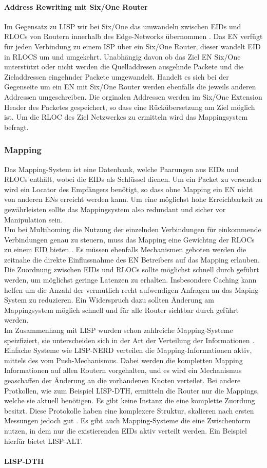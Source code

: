 \paragraph{Address Rewriting mit Six/One Router}
Im Gegensatz zu LISP wir bei Six/One das umwandeln zwischen EIDs und RLOCs von Routern innerhalb des Edge-Networks übernommen \cite{vogt:2008:six}. Das EN verfügt für jeden Verbindung zu einem ISP über ein Six/One Router, dieser wandelt EID in RLOCS um und umgekehrt. Unabhängig davon ob das Ziel EN Six/One unterstützt oder nicht werden die Quelladdresen ausgehnde Packete und die Zieladdressen eingehnder Packete umgewandelt. Handelt es sich bei der Gegenseite um ein EN mit Six/One Router werden ebenfalls die jeweils anderen Addressen umgeschreiben. Die orginalen Addressen werden im Six/One Extension Header des Packetes gespeichert, so dass eine Rückübersetzung am Ziel möglich ist. Um die RLOC des Ziel Netzwerkes zu ermitteln wird das Mappingsystem befragt.

\subsubsection{Mapping}
Das Mapping-System ist eine Datenbank, welche Paarungen aus EIDs und RLOCs enthält, wobei die EIDs als Schlüssel dienen. Um ein Packet zu versenden wird ein Locator des Empfängers benötigt, so dass ohne Mapping ein EN nicht von anderen ENs erreicht werden kann. Um eine möglichst hohe Erreichbarkeit zu gewährleisten sollte das Mappingsystem also redundant und sicher vor Manipulation sein. \\
Um bei Multihoming die Nutzung der einzelnden Verbindungen für einkommende Verbindungen genau zu steuern, muss das Mapping eine Gewichtng der RLOCs zu einem EID bieten \cite{mathy:2008:dht}. Es müssen ebenfalls Mechanismen geboten werden die zeitnahe die direkte Einflussnahme des EN Betreibers auf das Mapping erlauben. \\
Die Zuordnung zwischen EIDs und RLOCs sollte möglichst schnell durch geführt werden, um möglichst geringe Latenzen zu erhalten. Insbesondere Caching kann helfen um die Anzahl der vermutlich recht aufwendigen Anfragen an das Maping-System zu reduzieren. Ein Widerspruch dazu sollten Änderung am Mappingsystem möglich schnell und für alle Router sichtbar durch geführt werden. \\
Im Zusammenhang mit LISP wurden schon zahlreiche Mapping-Systeme speizfiziert, sie unterscheiden sich in der Art der Verteilung der Informationen \cite{mathy:2008:dht}. Einfache Systeme wie LISP-NERD verteilen die Mapping-Informationen aktiv, mittels des vom Push-Mechanismus. Dabei werden die kompletten Mapping Informationen auf allen Routern vorgehalten, und es wird ein Mechanismus geaschaffen der Änderung an die vorhandenen Knoten verteilet. Bei andere Protkollen, wie zum Beispiel LISP-DTH, ermitteln die Router nur die Mappings, welche sie aktuell benötigen. Es gibt keine Instanz die eine komplette Zuordung besitzt. Diese Protokolle haben eine komplexere Struktur, skalieren nach ersten Messungen jedoch gut \cite{iannone:2007:cost}. Es gibt auch Mapping-Systeme die eine Zwischenform nutzen, in dem nur die existierenden EIDs aktiv verteilt werden. Ein Beispiel hierfür bietet LISP-ALT.

\paragraph{LISP-DTH}




